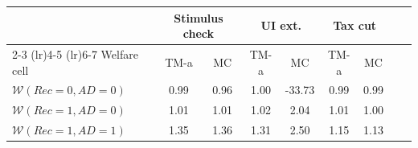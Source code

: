 \documentclass{econsocart}
\begin{document}
\begin{tabular}{@{}lcccccccc@{}}
\toprule
& \multicolumn{2}{c}{Stimulus check} & \multicolumn{2}{c}{UI ext.} & \multicolumn{2}{c}{Tax cut} \\
\cmidrule(lr){2-3} \cmidrule(lr){4-5} \cmidrule(lr){6-7}
Welfare cell & TM-a & MC & TM-a & MC & TM-a & MC \\ \midrule
$\mathcal{W}(Rec=0, AD=0)$ & 0.99 & 0.96 & 1.00 & -33.73 & 0.99 & 0.99 \\
$\mathcal{W}(Rec=1, AD=0)$ & 1.01 & 1.01 & 1.02 & 2.04 & 1.01 & 1.00 \\
$\mathcal{W}(Rec=1, AD=1)$ & 1.35 & 1.36 & 1.31 & 2.50 & 1.15 & 1.13 \\ \bottomrule
\end{tabular}
\end{document}
